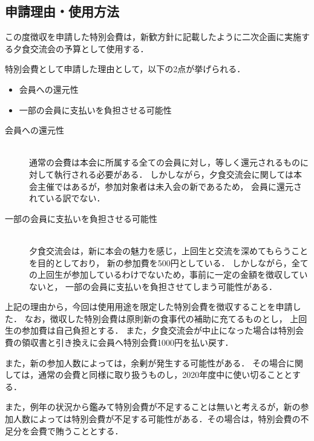 \subsection*{申請理由・使用方法}

この度徴収を申請した特別会費は，新歓方針に記載したように二次企画に実施する夕食交流会の予算として使用する．

特別会費として申請した理由として，以下の2点が挙げられる．
\begin{itemize}
    \item 会員への還元性
    \item 一部の会員に支払いを負担させる可能性
\end{itemize}

\begin{description}
    \item[会員への還元性]\mbox{}\\ %
        通常の会費は本会に所属する全ての会員に対し，等しく還元されるものに対して執行される必要がある．
        しかしながら，夕食交流会に関しては本会主催ではあるが，参加対象者は未入会の新\firstGrade{}であるため，
        会員に還元されている訳でない．

    \item[一部の会員に支払いを負担させる可能性]\mbox{}\\ %
        夕食交流会は，新\firstGrade{}に本会の魅力を感じ，上回生と交流を深めてもらうことを目的としており，
        新\firstGrade{}の参加費を500円としている．
        しかしながら，全ての上回生が参加しているわけでないため，事前に一定の金額を徴収していないと，
        一部の会員に支払いを負担させてしまう可能性がある．

 \end{description}

上記の理由から，今回は使用用途を限定した特別会費を徴収することを申請した．
なお，徴収した特別会費は原則新\firstGrade{}の食事代の補助に充てるものとし，
上回生の参加費は自己負担とする．
また，夕食交流会が中止になった場合は特別会費の領収書と引き換えに会員へ特別会費1000円を払い戻す．

また，新\firstGrade{}の参加人数によっては，余剰が発生する可能性がある．
その場合に関しては，通常の会費と同様に取り扱うものし，2020年度中に使い切ることとする．

また，例年の状況から鑑みて特別会費が不足することは無いと考えるが，新\firstGrade{}の参加人数によっては特別会費が不足する可能性がある．その場合は，特別会費の不足分を会費で賄うこととする．
